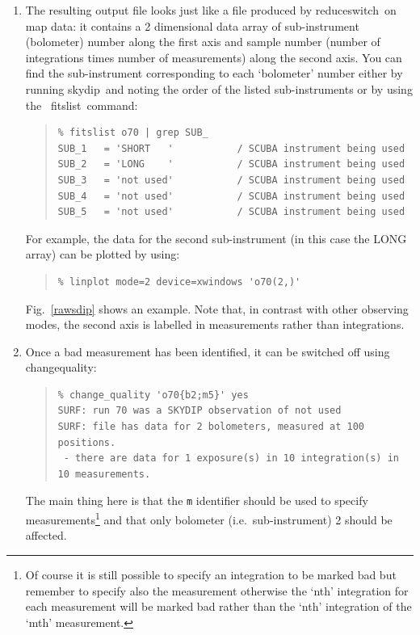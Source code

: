 \documentclass[twoside,11pt]{article}
\newcommand{\Kappa}{\xref{{\sc{Kappa}}}{sun95}{}}
\newcommand{\task}[1]{{\sf #1}}
\newcommand{\chgqual}{\htmlref{\task{change\_quality}}{CHANGE_QUALITY}}
\newcommand{\resw}{\htmlref{\task{reduce\_switch}}{REDUCE_SWITCH}}
\newcommand{\skydip}{\htmlref{\task{skydip}}{SKYDIP}}
\newcommand{\fitslist}{\xref{\task{fitslist}}{sun95}{FITSLIST}}
\newenvironment{myquote}{\begin{quote}\begin{small}}{\end{small}\end{quote}}
\newcommand{\htmlref}[2]{#1}
\newcommand{\xref}[3]{#1}
\renewcommand{\_}{\texttt{\symbol{95}}}
\begin{document}
\begin{enumerate}
\item The resulting output file looks just like a file produced by \resw\ on
map data: it contains a 2 dimensional data array of sub-instrument (bolometer)
number along the first axis and sample number (number of integrations times
number of measurements) along the second axis. You can find the sub-instrument corresponding to each `bolometer' 
number either by running \skydip\ and noting the order of the listed
sub-instruments or by using the \Kappa\ \fitslist\ command:
\begin{myquote}
\begin{verbatim}
% fitslist o70 | grep SUB_
SUB_1   = 'SHORT   '           / SCUBA instrument being used
SUB_2   = 'LONG    '           / SCUBA instrument being used
SUB_3   = 'not used'           / SCUBA instrument being used
SUB_4   = 'not used'           / SCUBA instrument being used
SUB_5   = 'not used'           / SCUBA instrument being used
\end{verbatim}
\end{myquote}
For example, the data for the
second  sub-instrument (in this case the LONG array) can be plotted by using:
\begin{myquote}
\begin{verbatim}
% linplot mode=2 device=xwindows 'o70(2,)'
\end{verbatim}
\end{myquote}
Fig.\ \ref{rawsdip} shows an example. Note that, in contrast with 
other observing modes, the second axis is labelled in measurements rather than
integrations.



\item Once a bad measurement has been identified, it can be switched off using 
\chgqual:
\begin{myquote}
\begin{verbatim}
% change_quality 'o70{b2;m5}' yes
SURF: run 70 was a SKYDIP observation of not used
SURF: file has data for 2 bolometers, measured at 100 positions.
 - there are data for 1 exposure(s) in 10 integration(s) in 10 measurements.
\end{verbatim}
\end{myquote}
The main thing here is that the \texttt{m} identifier should be used to specify
measurements\footnote{Of course it is still possible to specify an integration 
to be marked bad but remember to specify also the measurement otherwise the 
`nth' integration for each measurement will be marked bad rather than the
`nth' integration of the `mth' measurement.} and that only bolometer (i.e.\
sub-instrument) 2 should be affected. 





\end{enumerate}
\end{document}
